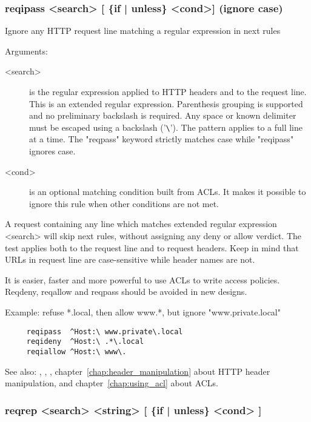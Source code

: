 {\subsubsection[reqipass]{reqipass <search> [ \{if | unless\} <cond>]  (ignore case) }


  Ignore any HTTP request line matching a regular expression in next rules


  Arguments:
  \begin{description}
  \item[<search>] is the regular expression applied to HTTP headers and to the
              request line. This is an extended regular expression. Parenthesis
              grouping is supported and no preliminary backslash is required.
              Any space or known delimiter must be escaped using a backslash
              ('\verb|\|'). The pattern applies to a full line at a time. The
              "reqpass" keyword strictly matches case while "reqipass" ignores
              case.

  \item[<cond>] is an optional matching condition built from ACLs. It makes it
              possible to ignore this rule when other conditions are not met.
  \end{description}

  A request containing any line which matches extended regular expression
  <search> will skip next rules, without assigning any deny or allow verdict.
  The test applies both to the request line and to request headers. Keep in
  mind that URLs in request line are case-sensitive while header names are not.

  It is easier, faster and more powerful to use ACLs to write access policies.
  Reqdeny, reqallow and reqpass should be avoided in new designs.

  Example: refuse *.local, then allow www.*, but ignore "www.private.local"
  \begin{verbatim}
     reqipass  ^Host:\ www.private\.local
     reqideny  ^Host:\ .*\.local
     reqiallow ^Host:\ www\.
  \end{verbatim}

  See also: , , , chapter~\ref{chap:header_manipulation} about HTTP header
            manipulation, and chapter~\ref{chap:using_acl} about ACLs.

\subsubsection[reqrep]{reqrep <search> <string> [ \{if | unless\} <cond> ]}
}
